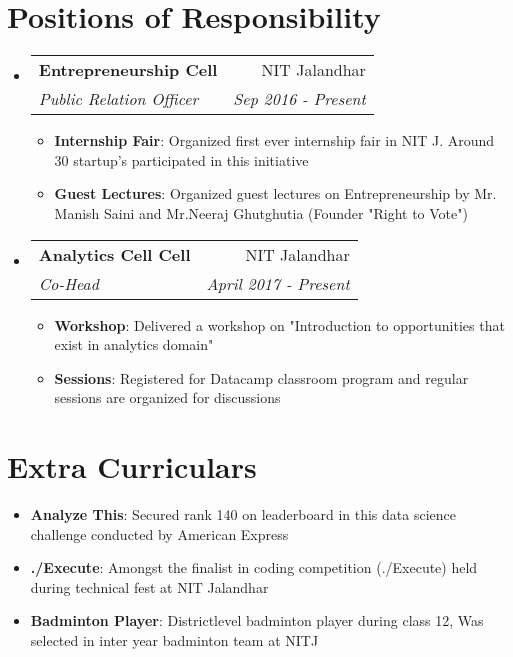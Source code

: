 \documentclass[letterpaper,10.9pt]{article}
\makeatletter
\newcommand{\resumeItem}[2]{
  \item\small{
    \textbf{#1}{: #2 \vspace{-2pt}}
  }
}
\newcommand{\resumeSubheading}[4]{
  \vspace{-1pt}\item
    \begin{tabular*}{0.97\textwidth}{l@{\extracolsep{\fill}}r}
      \textbf{#1} & #2 \\
      \textit{\small#3} & \textit{\small #4} \\
    \end{tabular*}\vspace{-5pt}
}
\newcommand{\resumeSubItem}[2]{\resumeItem{#1}{#2}\vspace{-4pt}}
\newcommand{\resumeSubHeadingListStart}{\begin{itemize}[leftmargin=*]}
\newcommand{\resumeSubHeadingListEnd}{\end{itemize}}
\newcommand{\resumeItemListStart}{\begin{itemize}}
\newcommand{\resumeItemListEnd}{\end{itemize}\vspace{-5pt}}
\makeatother
\begin{document}

\section{Positions of Responsibility}
\resumeSubHeadingListStart

\resumeSubheading
{Entrepreneurship Cell}{NIT Jalandhar}
{Public Relation Officer}{Sep 2016 - Present}
\resumeItemListStart
\resumeItem{Internship Fair}
{Organized first ever internship fair in NIT J. Around 30 startup's participated in this initiative}
\resumeItem{Guest Lectures}
{Organized guest lectures on Entrepreneurship by Mr. Manish Saini and Mr.Neeraj Ghutghutia (Founder "Right to Vote")}

\resumeItemListEnd

\resumeSubheading
{Analytics Cell Cell}{NIT Jalandhar}
{Co-Head}{April 2017 - Present}
\resumeItemListStart
\resumeItem{Workshop}
{Delivered a workshop on "Introduction to opportunities that exist in analytics domain"}
\resumeItem{Sessions}
{Registered for Datacamp classroom program and regular sessions are organized for discussions}

\resumeItemListEnd

\resumeSubHeadingListEnd



\section{Extra Curriculars}
\resumeSubHeadingListStart
\resumeSubItem{Analyze This}
{Secured rank 140 on leaderboard in this data science challenge conducted by American Express}

\resumeSubItem{./Execute}
{Amongst the finalist in coding competition (./Execute) held during technical fest at NIT Jalandhar}

\resumeSubItem{Badminton Player}
{Districtlevel badminton player during class 12, Was selected in inter year badminton team at NITJ}

\resumeSubHeadingListEnd
\end{document}
